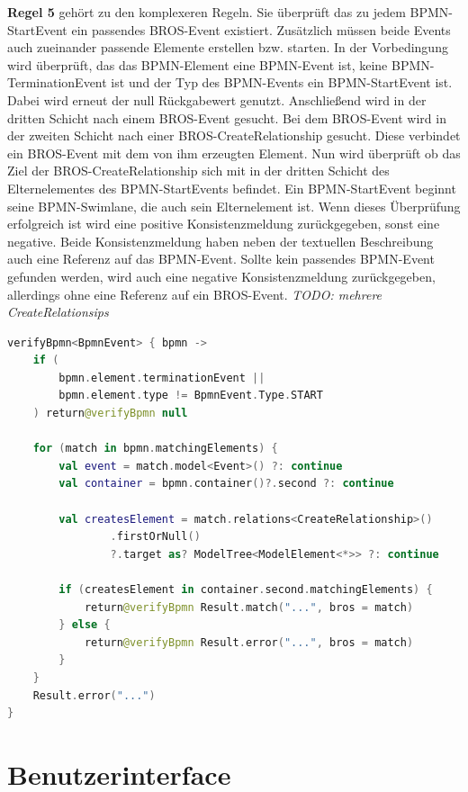 \textbf{Regel 5} gehört zu den komplexeren Regeln.
Sie überprüft das zu jedem BPMN-StartEvent ein passendes BROS-Event existiert.
Zusätzlich müssen beide Events auch zueinander passende Elemente erstellen bzw. starten.
In der Vorbedingung wird überprüft, das das BPMN-Element eine BPMN-Event ist, keine BPMN-TerminationEvent ist und der Typ des BPMN-Events ein BPMN-StartEvent ist.
Dabei wird erneut der null Rückgabewert genutzt.
Anschließend wird in der dritten Schicht nach einem BROS-Event gesucht.
Bei dem BROS-Event wird in der zweiten Schicht nach einer BROS-CreateRelationship gesucht.
Diese verbindet ein BROS-Event mit dem von ihm erzeugten Element.
Nun wird überprüft ob das Ziel der BROS-CreateRelationship sich mit in der dritten Schicht des Elternelementes des BPMN-StartEvents befindet.
Ein BPMN-StartEvent beginnt seine BPMN-Swimlane, die auch sein Elternelement ist.
Wenn dieses Überprüfung erfolgreich ist wird eine positive Konsistenzmeldung zurückgegeben, sonst eine negative.
Beide Konsistenzmeldung haben neben der textuellen Beschreibung auch eine Referenz auf das BPMN-Event.
Sollte kein passendes BPMN-Event gefunden werden, wird auch eine negative Konsistenzmeldung zurückgegeben, allerdings ohne eine Referenz auf ein BROS-Event.
\textit{TODO: mehrere CreateRelationsips}

\begin{lstlisting}[language=Kotlin, caption=Implementierung von Regel 5, label=lst:implementation_rule_5]
verifyBpmn<BpmnEvent> { bpmn ->
    if (
        bpmn.element.terminationEvent || 
        bpmn.element.type != BpmnEvent.Type.START
    ) return@verifyBpmn null

    for (match in bpmn.matchingElements) {
        val event = match.model<Event>() ?: continue
        val container = bpmn.container()?.second ?: continue

        val createsElement = match.relations<CreateRelationship>()
                .firstOrNull()
                ?.target as? ModelTree<ModelElement<*>> ?: continue

        if (createsElement in container.second.matchingElements) {
            return@verifyBpmn Result.match("...", bros = match)
        } else {
            return@verifyBpmn Result.error("...", bros = match)
        }
    }
    Result.error("...")
}
\end{lstlisting}

\section{Benutzerinterface}

